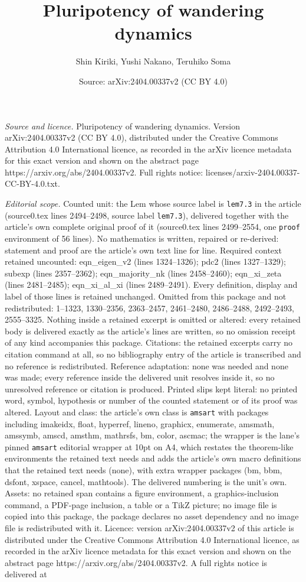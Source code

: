 \documentclass[10pt,a4paper]{amsart}
\title[Pluripotency of wandering dynamics]{Pluripotency of wandering dynamics}
\author{Shin Kiriki, Yushi Nakano, Teruhiko Soma}
\date{Source: arXiv:2404.00337v2 (CC BY 4.0)}
\begin{document}
\maketitle

\noindent\emph{Source and licence.} Pluripotency of wandering dynamics. Version arXiv:2404.00337v2 (CC BY 4.0), distributed under the Creative Commons Attribution 4.0 International licence, as recorded in the arXiv licence metadata for this exact version and shown on the abstract page https://arxiv.org/abs/2404.00337v2. Full rights notice: licenses/arxiv-2404.00337-CC-BY-4.0.txt.\par\smallskip

\noindent\textit{Editorial scope.} Counted unit: the Lem whose source label is \texttt{lem7.3} in the article (source0.tex lines 2494--2498, source label \texttt{lem7.3}), delivered together with the article's own complete original proof of it (source0.tex lines 2499--2554, one \texttt{proof} environment of 56 lines). No mathematics is written, repaired or re-derived: statement and proof are the article's own text line for line. Required context retained uncounted: eqn\_eigen\_v2 (lines 1324--1326); pdc2 (lines 1327--1329); subexp (lines 2357--2362); eqn\_majority\_nk (lines 2458--2460); eqn\_xi\_zeta (lines 2481--2485); eqn\_xi\_al\_xi (lines 2489--2491). Every definition, display and label of those lines is retained unchanged. Omitted from this package and not redistributed: 1--1323, 1330--2356, 2363--2457, 2461--2480, 2486--2488, 2492--2493, 2555--3325. Nothing inside a retained excerpt is omitted or altered: every retained body is delivered exactly as the article's lines are written, so no omission receipt of any kind accompanies this package. Citations: the retained excerpts carry no citation command at all, so no bibliography entry of the article is transcribed and no reference is redistributed. Reference adaptation: none was needed and none was made; every reference inside the delivered unit resolves inside it, so no unresolved reference or citation is produced. Printed slips kept literal: no printed word, symbol, hypothesis or number of the counted statement or of its proof was altered. Layout and class: the article's own class is \texttt{amsart} with packages including imakeidx, float, hyperref, lineno, graphicx, enumerate, amsmath, amssymb, amscd, amsthm, mathrsfs, bm, color, ascmac; the wrapper is the lane's pinned \texttt{amsart} editorial wrapper at 10pt on A4, which restates the theorem-like environments the retained text needs and adds the article's own macro definitions that the retained text needs (none), with extra wrapper packages (bm, bbm, dsfont, xspace, cancel, mathtools). The delivered numbering is the unit's own. Assets: no retained span contains a figure environment, a graphics-inclusion command, a PDF-page inclusion, a table or a TikZ picture; no image file is copied into this package, the package declares no asset dependency and no image file is redistributed with it. Licence: version arXiv:2404.00337v2 of this article is distributed under the Creative Commons Attribution 4.0 International licence, as recorded in the arXiv licence metadata for this exact version and shown on the abstract page https://arxiv.org/abs/2404.00337v2. A full rights notice is delivered at 
\end{document}
